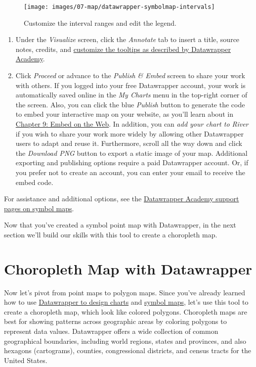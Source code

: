 \documentclass[
  english,
]{book}
\begin{document}
\begin{figure}
\texttt{[image: images/07-map/datawrapper-symbolmap-intervals]} \caption{Customize the interval ranges and edit the legend.}\label{fig:datawrapper-symbolmap-intervals}
\end{figure}

\begin{enumerate}
\def\labelenumi{\arabic{enumi}.}
\setcounter{enumi}{9}
\item
  Under the \emph{Visualize} screen, click the \emph{Annotate} tab to insert a title, source notes, credits, and \href{https://academy.datawrapper.de/article/237-i-want-to-change-how-my-data-appears-in-tooltips\#change-the-number-format}{customize the tooltips as described by Datawrapper Academy}.
\item
  Click \emph{Proceed} or advance to the \emph{Publish \& Embed} screen to share your work with others. If you logged into your free Datawrapper account, your work is automatically saved online in the \emph{My Charts} menu in the top-right corner of the screen. Also, you can click the blue \emph{Publish} button to generate the code to embed your interactive map on your website, as you'll learn about in \href{embed.html}{Chapter 9: Embed on the Web}. In addition, you can \emph{add your chart to River} if you wish to share your work more widely by allowing other Datawrapper users to adapt and reuse it. Furthermore, scroll all the way down and click the \emph{Download PNG} button to export a static image of your map. Additional exporting and publishing options require a paid Datawrapper account. Or, if you prefer not to create an account, you can enter your email to receive the embed code.
\end{enumerate}

For assistance and additional options, see the \href{https://academy.datawrapper.de/category/278-symbol-maps}{Datawrapper Academy support pages on symbol maps}.

Now that you've created a symbol point map with Datawrapper, in the next section we'll build our skills with this tool to create a choropleth map.

\hypertarget{choropleth-datawrapper}{%
\section*{Choropleth Map with Datawrapper}\label{choropleth-datawrapper}}

Now let's pivot from point maps to polygon maps. Since you've already learned how to use \href{chart-datawrapper.html}{Datawrapper to design charts} and \href{datawrapper-symbolmap.html}{symbol maps}, let's use this tool to create a choropleth map, which look like colored polygons. Choropleth maps are best for showing patterns across geographic areas by coloring polygons to represent data values. Datawrapper offers a wide collection of common geographical boundaries, including world regions, states and provinces, and also hexagons (cartograms), counties, congressional districts, and census tracts for the United States.
\end{document}

